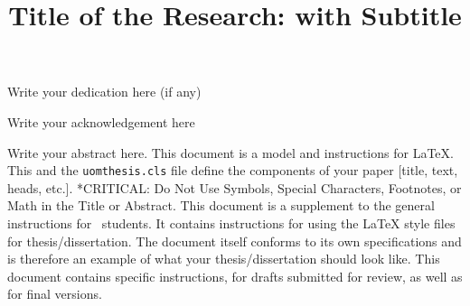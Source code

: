 \documentclass[12pt]{uomthesis}
\begin{document}
\title{Title of the Research: with Subtitle}
\supervisorName{}  %


\maketitle


Write your dedication here (if any)

Write your acknowledgement here 


\begin{abstractpage}
Write your abstract here. This document is a model and instructions for \LaTeX{}. This and the \texttt{uomthesis.cls} file define the components of your paper [title, text, heads, etc.]. *CRITICAL: Do Not Use Symbols, Special Characters, Footnotes, or Math in the Title or Abstract. This document is a supplement to the general instructions for~\UoM{} students. It contains instructions for using the \LaTeX{} style files for thesis/dissertation. The document itself conforms to its own specifications and is therefore an example of what your thesis/dissertation should look like. This document contains specific instructions, for drafts submitted for review, as well as for final versions. 
\end{abstractpage}


\begin{ToC}
\makeatletter
 \makeatother
\end{ToC}

\iffigures
    \begin{LoF}
        \makeatletter
        \makeatother
    \end{LoF}
\fi
\end{document}
